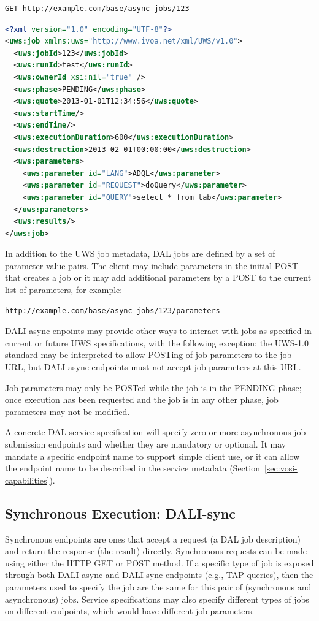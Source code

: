 \documentclass[11pt,letter]{ivoa}
\begin{document}
\begin{verbatim}
GET http://example.com/base/async-jobs/123
\end{verbatim}

\begin{lstlisting}[language=XML,basicstyle=\footnotesize]
<?xml version="1.0" encoding="UTF-8"?>
<uws:job xmlns:uws="http://www.ivoa.net/xml/UWS/v1.0">
  <uws:jobId>123</uws:jobId>
  <uws:runId>test</uws:runId>
  <uws:ownerId xsi:nil="true" />
  <uws:phase>PENDING</uws:phase>
  <uws:quote>2013-01-01T12:34:56</uws:quote>
  <uws:startTime/>
  <uws:endTime/>
  <uws:executionDuration>600</uws:executionDuration>
  <uws:destruction>2013-02-01T00:00:00</uws:destruction>
  <uws:parameters>
    <uws:parameter id="LANG">ADQL</uws:parameter>
    <uws:parameter id="REQUEST">doQuery</uws:parameter>
    <uws:parameter id="QUERY">select * from tab</uws:parameter>
  </uws:parameters>
  <uws:results/>
</uws:job>
\end{lstlisting}

In addition to the UWS job metadata, DAL jobs are defined by a set of
parameter-value pairs. The client may include parameters in the initial POST
that creates a job or it may add additional parameters by a POST to the current
list of parameters, for example:

\begin{verbatim}
http://example.com/base/async-jobs/123/parameters
\end{verbatim}

DALI-async enpoints may provide other ways to interact with jobs as specified
in current or future UWS specifications, with the following exception: the
UWS-1.0 standard may be interpreted to allow POSTing of job parameters to the
job URL, but DALI-async endpoints must not accept job parameters at this URL.

Job parameters may only be POSTed while the job is in the PENDING phase; once
execution has been requested and the job is in any other phase, job parameters
may not be modified.

A concrete DAL service specification will specify zero or more asynchronous job
submission endpoints and whether they are mandatory or optional. It may mandate
a specific endpoint name to support simple client use, or it can allow the
endpoint name to be described in the service metadata (Section~\ref{sec:vosi-capabilities}).

\subsection{Synchronous Execution: DALI-sync}
\label{sec:dali-sync}
Synchronous endpoints are ones that accept a request (a DAL job
description) and return the response (the result) directly. Synchronous requests
can be made using either the HTTP GET or POST method. If a specific type of job
is exposed through both DALI-async and DALI-sync endpoints (e.g., TAP queries),
then the parameters used to specify the job are the same for  this pair of
(synchronous and asynchronous) jobs. Service specifications may also specify
different types of jobs on different endpoints, which would have different job
parameters.
\end{document}
